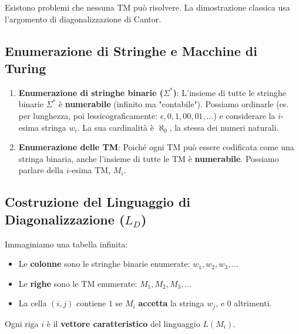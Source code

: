 \documentclass[a4paper]{article}
\theoremstyle{remark} %
\begin{document}
Esistono problemi che nessuna TM può risolvere. La dimostrazione classica usa l'argomento di diagonalizzazione di Cantor.

\subsection{Enumerazione di Stringhe e Macchine di Turing}

\begin{enumerate}
    \item \textbf{Enumerazione di stringhe binarie ($\Sigma^*$)}: L'insieme di tutte le stringhe binarie $\Sigma^*$ è \textbf{numerabile} (infinito ma "contabile"). Possiamo ordinarle (es. per lunghezza, poi lessicograficamente: $\epsilon, 0, 1, 00, 01, \dots$) e considerare la $i$-esima stringa $w_i$. La sua cardinalità è $\aleph_0$, la stessa dei numeri naturali.
    \item \textbf{Enumerazione delle TM}: Poiché ogni TM può essere codificata come una stringa binaria, anche l'insieme di tutte le TM è \textbf{numerabile}. Possiamo parlare della $i$-esima TM, $M_i$.
\end{enumerate}

\subsection{Costruzione del Linguaggio di Diagonalizzazione ($L_D$)}
Immaginiamo una tabella infinita:
\begin{itemize}
    \item Le \textbf{colonne} sono le stringhe binarie enumerate: $w_1, w_2, w_3, \dots$
    \item Le \textbf{righe} sono le TM enumerate: $M_1, M_2, M_3, \dots$
    \item La cella $(i, j)$ contiene $1$ se $M_i$ \textbf{accetta} la stringa $w_j$, e $0$ altrimenti.
\end{itemize}

Ogni riga $i$ è il \textbf{vettore caratteristico} del linguaggio $L(M_i)$.
\end{document}
